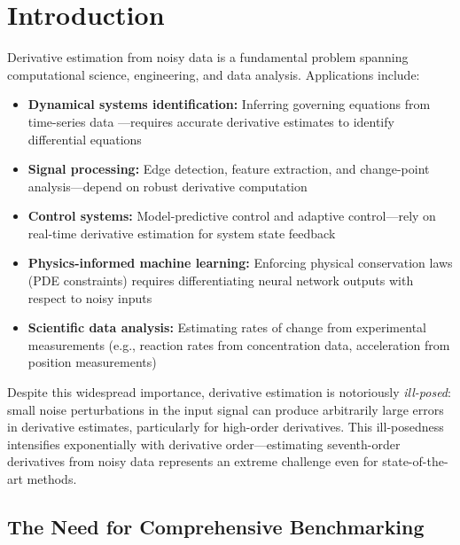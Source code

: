 \section{Introduction}
\label{sec:introduction}

Derivative estimation from noisy data is a fundamental problem spanning computational science, engineering, and data analysis. Applications include:

\begin{itemize}
    \item \textbf{Dynamical systems identification:} Inferring governing equations from time-series data \cite{brunton2016discovering}—requires accurate derivative estimates to identify differential equations
    \item \textbf{Signal processing:} Edge detection, feature extraction, and change-point analysis—depend on robust derivative computation
    \item \textbf{Control systems:} Model-predictive control and adaptive control—rely on real-time derivative estimation for system state feedback
    \item \textbf{Physics-informed machine learning:} Enforcing physical conservation laws (PDE constraints) requires differentiating neural network outputs with respect to noisy inputs
    \item \textbf{Scientific data analysis:} Estimating rates of change from experimental measurements (e.g., reaction rates from concentration data, acceleration from position measurements)
\end{itemize}

Despite this widespread importance, derivative estimation is notoriously \textit{ill-posed}: small noise perturbations in the input signal can produce arbitrarily large errors in derivative estimates, particularly for high-order derivatives. This ill-posedness intensifies exponentially with derivative order—estimating seventh-order derivatives from noisy data represents an extreme challenge even for state-of-the-art methods.

\subsection{The Need for Comprehensive Benchmarking}
\label{sec:motivation}

